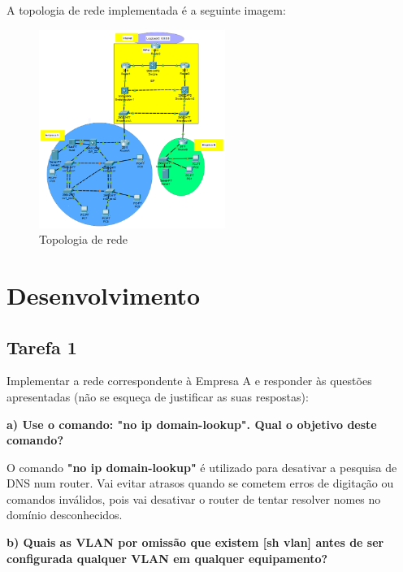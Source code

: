 \documentclass[11pt,english, openright, oneside]{book}
\begin{document}
A topologia de rede implementada é a seguinte imagem:


\begin{figure}[H]
    \centering
    \includegraphics[width=0.54\textwidth]{imagens/topologia.png}
    \caption{Topologia de rede}
    \label{fig:topologia}
\end{figure}


\chapter{Desenvolvimento}

\section{Tarefa 1}
\vspace{0.2cm}

Implementar a rede correspondente à Empresa A e responder às questões
apresentadas (não se esqueça de justificar as suas respostas):  

\vspace{0.8cm}

\textbf{a) Use o comando: "no ip domain-lookup". Qual o objetivo deste comando?}
\vspace{0.2cm}

O comando \textbf{"no ip domain-lookup"} é utilizado para desativar a pesquisa
de DNS num router. Vai evitar atrasos quando se cometem erros de digitação ou
comandos inválidos, pois vai desativar o router de tentar resolver nomes no
domínio desconhecidos.
\vspace{0.8cm}


\textbf{b) Quais as VLAN por omissão que existem [sh vlan] antes de ser configurada qualquer VLAN em qualquer equipamento?}
\vspace{0.2cm}
\end{document}
